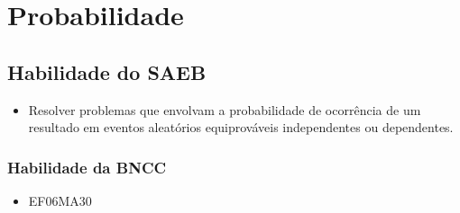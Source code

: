 

\chapter{ Probabilidade}

\section*{Habilidade do SAEB}
\begin{itemize}
\item Resolver problemas que envolvam a probabilidade de
ocorrência de um resultado em eventos aleatórios equiprováveis
independentes ou dependentes.
\end{itemize}

\subsection{Habilidade da BNCC} 
\begin{itemize}
\item EF06MA30
\end{itemize}

